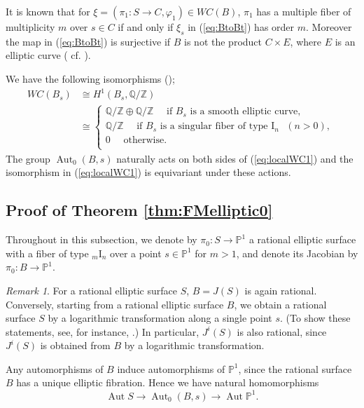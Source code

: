 \documentclass[a4paper,11pt]{article}
\theoremstyle{definition}\newtheorem{defn}[thm]{Definition}
\theoremstyle{remark}\newtheorem{remark}[thm]{Remark}
\numberwithin{equation}{section}
\newcommand{\Aut}{\ensuremath{\operatorname{Aut}}}
\newcommand{\id}{\ensuremath{\operatorname{id}}}
\newcommand{\rom}{\textrm}
\newcommand{\PP}{\mathbb P}
\newcommand{\Z}{\mathbb Z}
\newcommand{\Q}{\mathbb Q}
\begin{document}
It is known that for $\xi=(\pi_1\colon S\to C,\varphi_1)\in WC(B)$, 
$\pi_1$ has a multiple fiber of multiplicity $m$ over 
$s\in C$ if and only if $\xi_s$ in (\ref{eq:BtoBt}) has order $m$.
Moreover the map in (\ref{eq:BtoBt}) is surjective
if $B$ is not the product $C\times E$, where $E$ is an elliptic curve
(%
 cf. \cite[Theorem 5.4.1]{CD89}). 

We have the following isomorphisms (\cite[page 124]{Do81});
%
\begin{align}
WC(B_{s})& \cong H^1(B_s,\Q/\Z) \label{eq:localWC1} \\
&\cong
\begin{cases}
\Q/\Z\oplus \Q/\Z \quad \text{ if $B_s$ is a smooth elliptic curve, }\\
\Q/\Z \quad \text{ if $B_s$ is a singular fiber of type $\rom{I}_n$ $(n>0)$, }\\0 \quad \text{ otherwise. }\\
\end{cases}\label{eq:localWC2}
\end{align}
%
The group $\Aut _0(B,s)$ naturally acts on both sides of
(\ref{eq:localWC1}) and the isomorphism in (\ref{eq:localWC1})
is equivariant 
under these actions.


 \subsection{Proof of Theorem \ref{thm:FMelliptic0}}
 \label{section:rational}
Throughout in this subsection,
we denote by $\pi _0\colon S\to \PP^1$  a rational  elliptic surface
with a fiber of type $_m\rom{I}_n$ over a point $s\in\PP ^1$ 
for $m>1$, and denote its Jacobian by $\pi_0\colon B\to \PP ^1$.

\begin{remark}\label{rem:rationalBS}
For a rational  elliptic surface $S$, $B=J(S)$ is again rational.
Conversely, starting from a rational  elliptic surface $B$, 
we obtain a rational surface $S$ by a logarithmic transformation 
along a single point $s$. (To show these statements, see, for instance,   
\cite[Proposition 1.3.23, Theorem 1.6.7]{FM94}.)
In particular, $J^i(S)$ is also rational, since 
$J^i(S)$ is obtained from $B$ by a logarithmic transformation. 
\end{remark}
Any automorphisms 
of $B$ induce automorphisms of $\PP^1$, 
since the rational surface 
$B$ has a unique elliptic fibration. 
Hence we have natural homomorphisms 
$$
\Aut S\to \Aut _0(B,s)\to \Aut \PP^1 .
$$
\end{document}
